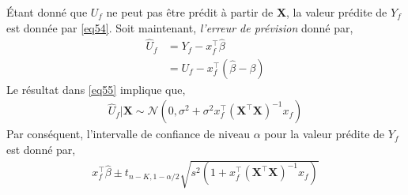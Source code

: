 \'Etant donné que $U_f$ ne peut pas être prédit à partir de $\mathbf{X}$, la valeur prédite de $Y_f$ est donnée par \eqref{eq54}. Soit maintenant, \emph{l'erreur de prévision} donné par,
\begin{align*}
\widehat{U}_f &=Y_f -x_f^\top\widehat{\beta}\\
&=U_f - x_f^\top(\widehat{\beta}-\beta) 
\end{align*}
Le résultat dans \eqref{eq55} implique que,
\begin{align*}
\widehat{U}_f | \mathbf{X} \sim \mathcal{N}(0, \sigma^2 + \sigma^2x_f^\top(\mathbf{X}^\top\mathbf{X})^{-1}x_f)
\end{align*}
Par conséquent, l'intervalle de confiance de niveau $\alpha$ pour la valeur prédite de $Y_f$ est donné par,
\begin{align*}
x_f^\top\widehat{\beta} \pm t_{n-K, 1-\alpha/2}\sqrt{s^2(1+x_f^\top (\mathbf{X}^\top\mathbf{X})^{-1}x_f)}
\end{align*}

%
%
